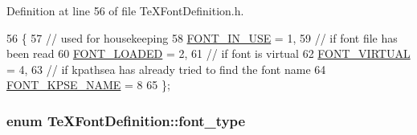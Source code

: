 Definition at line 56 of file Te\+X\+Font\+Definition.\+h.


\begin{DoxyCode}
56                   \{
57     \textcolor{comment}{// used for housekeeping}
58     \hyperlink{classTeXFontDefinition_a5e758fb1a6ddffb8325b1f893132ce7aa437568b2048a9f1efcce8a3aa0722d70}{FONT\_IN\_USE} = 1,
59     \textcolor{comment}{// if font file has been read}
60     \hyperlink{classTeXFontDefinition_a5e758fb1a6ddffb8325b1f893132ce7aa1ba1a9855372c90eeab01e3cfa06c83f}{FONT\_LOADED} = 2,
61     \textcolor{comment}{// if font is virtual}
62     \hyperlink{classTeXFontDefinition_a5e758fb1a6ddffb8325b1f893132ce7aadec6d0da445c6ed411d92ccfd61e32bd}{FONT\_VIRTUAL} = 4,
63     \textcolor{comment}{// if kpathsea has already tried to find the font name}
64     \hyperlink{classTeXFontDefinition_a5e758fb1a6ddffb8325b1f893132ce7aaa5817af5df3fc6d468421edb2fff79a6}{FONT\_KPSE\_NAME} = 8
65   \};
\end{DoxyCode}
\hypertarget{classTeXFontDefinition_a74669917a483ec5a5c8dd8e0335fbd8b}{
\subsubsection[{font\+\_\+type}]{\setlength{\rightskip}{0pt plus 5cm}enum {\bf Te\+X\+Font\+Definition\+::font\+\_\+type}}}\label{classTeXFontDefinition_a74669917a483ec5a5c8dd8e0335fbd8b}
